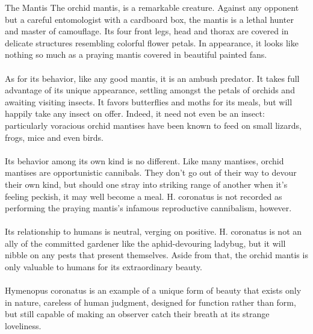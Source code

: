 \begin{mytcbox}{The Mantis}
	The orchid mantis, is a remarkable creature. Against any opponent but a careful entomologist with a cardboard box, the mantis is a lethal hunter and master of camouflage. Its four front legs, head and thorax are covered in delicate structures resembling colorful flower petals. In appearance, it looks like nothing so much as a praying mantis covered in beautiful painted fans.
	\\
	\\
	As for its behavior, like any good mantis, it is an ambush predator. It takes full advantage of its unique appearance, settling amongst the petals of orchids and awaiting visiting insects. It favors butterflies and moths for its meals, but will happily take any insect on offer. Indeed, it need not even be an insect: particularly voracious orchid mantises have been known to feed on small lizards, frogs, mice and even birds.
	\\
	\\
	Its behavior among its own kind is no different. Like many mantises, orchid mantises are opportunistic cannibals. They don't go out of their way to devour their own kind, but should one stray into striking range of another when it's feeling peckish, it may well become a meal. H. coronatus is not recorded as performing the praying mantis's infamous reproductive cannibalism, however.
	\\
	\\
	Its relationship to humans is neutral, verging on positive. H. coronatus is not an ally of the committed gardener like the aphid-devouring ladybug, but it will nibble on any pests that present themselves. Aside from that, the orchid mantis is only valuable to humans for its extraordinary beauty.
	\\
	\\
	Hymenopus coronatus is an example of a unique form of beauty that exists only in nature, careless of human judgment, designed for function rather than form, but still capable of making an observer catch their breath at its strange loveliness.
\end{mytcbox}